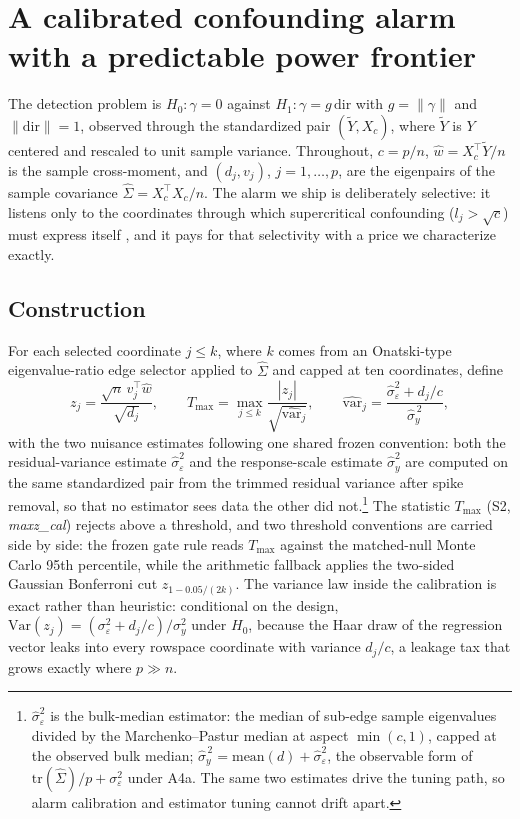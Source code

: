 \section{A calibrated confounding alarm with a predictable power frontier}
\label{sec:detection}

The detection problem is $H_0\colon \gamma=0$ against $H_1\colon \gamma=g\,\mathrm{dir}$ with $g=\|\gamma\|$ and $\|\mathrm{dir}\|=1$, observed through the standardized pair $(\tilde Y,X_c)$, where $\tilde Y$ is $Y$ centered and rescaled to unit sample variance. Throughout, $c=p/n$, $\hat w=X_c^{\top}\tilde Y/n$ is the sample cross-moment, and $(d_j,v_j)$, $j=1,\dots,p$, are the eigenpairs of the sample covariance $\hat\Sigma=X_c^\top X_c/n$. The alarm we ship is deliberately selective: it listens only to the coordinates through which supercritical confounding ($l_j>\sqrt c$) must express itself \citep{bbp2005phase,benaychgeorges2012singular}, and it pays for that selectivity with a price we characterize exactly.

\subsection{Construction}

For each selected coordinate $j\le k$, where $k$ comes from an Onatski-type eigenvalue-ratio edge selector \citep{onatski2010determining} applied to $\hat\Sigma$ and capped at ten coordinates, define
\[
z_j=\frac{\sqrt n\, v_j^\top \hat w}{\sqrt{d_j}},
\qquad
T_{\max}=\max_{j\le k}\frac{|z_j|}{\sqrt{\widehat{\mathrm{var}}_j}},
\qquad
\widehat{\mathrm{var}}_j=\frac{\hat\sigma_\varepsilon^2+d_j/c}{\hat\sigma_y^{\,2}},
\]
with the two nuisance estimates following one shared frozen convention: both the residual-variance estimate $\hat\sigma_\varepsilon^2$ and the response-scale estimate $\hat\sigma_y^2$ are computed on the same standardized pair from the trimmed residual variance after spike removal, so that no estimator sees data the other did not.\footnote{$\hat\sigma_\varepsilon^2$ is the bulk-median estimator: the median of sub-edge sample eigenvalues divided by the Marchenko--Pastur median at aspect $\min(c,1)$, capped at the observed bulk median; $\hat\sigma_y^{\,2}=\mathrm{mean}(d)+\hat\sigma_\varepsilon^2$, the observable form of $\mathrm{tr}(\hat\Sigma)/p+\sigma_\varepsilon^2$ under A4a. The same two estimates drive the tuning path, so alarm calibration and estimator tuning cannot drift apart.} The statistic $T_{\max}$ (S2, \emph{maxz\_cal}) rejects above a threshold, and two threshold conventions are carried side by side: the frozen gate rule reads $T_{\max}$ against the matched-null Monte Carlo 95th percentile, while the arithmetic fallback applies the two-sided Gaussian Bonferroni cut $z_{1-0.05/(2k)}$. The variance law inside the calibration is exact rather than heuristic: conditional on the design, $\mathrm{Var}(z_j)=(\sigma_\varepsilon^2+d_j/c)/\sigma_y^2$ under $H_0$, because the Haar draw of the regression vector leaks into every rowspace coordinate with variance $d_j/c$, a leakage tax that grows exactly where $p\gg n$.

